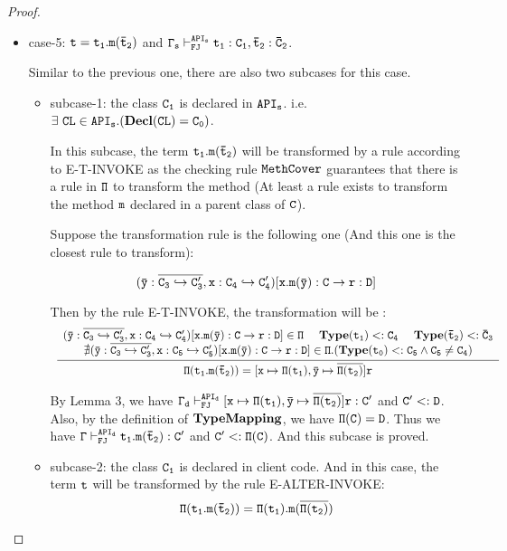 \documentclass[letterpaper]{article}
\newcommand{\env}[2]{\vdash_{#1}^{#2}}
\begin{document}
\begin{proof}
\begin{itemize}
  \item case-5: $\tt t = t_1.m(\bar{t}_2)$ and $\tt \Gamma_s\env{FJ}{API_s}t_1:C_1,\bar{t}_2:\bar{C}_2$.

  Similar to the previous one, there are also two subcases for this case.
  \begin{itemize}
    \item subcase-1: the class $\tt C_1$ is declared in $\tt API_s$. i.e. $\tt \exists~CL\in API_s.(\mathbf{Decl}(CL)=C_0)$.

    In this subcase, the term $\tt t_1.m(\bar{t}_2)$ will be transformed by a rule according to E-T-INVOKE as the checking rule $\tt MethCover$ guarantees that there is a rule in $\tt \Pi$ to transform the method (At least a rule exists to transform the method $\tt m$ declared in a parent class of $\tt C$).

    Suppose the transformation rule is the following one (And this one is the closest rule to transform):

    $$\tt (\bar{y}:\overline{C_3\hookrightarrow C'_3}, x:C_4\hookrightarrow C'_4)[x.m(\bar{y}):C\rightarrow r:D]$$

    Then by the rule E-T-INVOKE, the transformation will be :
    \[
      \begin{array}{c}
        \infer
        {\tt \Pi(t_1.m(\bar{t}_2))=[x\mapsto\Pi(t_1), \bar{y}\mapsto\overline{\Pi(t_2)}]r}
        {
          \begin{array}{c c}
            \tt (\bar{y}:\overline{C_3\hookrightarrow C'_3}, x:C_4\hookrightarrow C'_4)[x.m(\bar{y}):C\rightarrow r:D]\in\Pi ~~~~
            \tt \mathbf{Type}(t_1) <: C_4 ~~~~ \mathbf{Type}(\bar{t}_2)<:\bar{C}_3 \\
            \tt \nexists (\bar{y}:\overline{C_3\hookrightarrow C'_3}, x:C_5\hookrightarrow C'_5)[x.m(\bar{y}):C\rightarrow r:D]\in\Pi.(\mathbf{Type}(t_0)<:C_5 \land C_5\neq C_4)
          \end{array}
        }
      \end{array}
    \]

    By Lemma 3, we have $\tt \Gamma_d\env{FJ}{API_d}[x\mapsto\Pi(t_1), \bar{y}\mapsto\overline{\Pi(t_2)}]r:C'$ and $\tt C'<:D$. Also, by the definition of $\tt \mathbf{TypeMapping}$, we have $\tt \Pi(C)=D$. Thus we have $\tt\Gamma\env{FJ}{API_d}t_1.m(\bar{t}_2):C'$ and $\tt C'<:\Pi(C)$. And this subcase is proved.

    \item subcase-2: the class $\tt C_1$ is declared in client code. And in this case, the term $\tt t$ will be transformed by the rule E-ALTER-INVOKE:
    $$\tt \Pi(t_1.m(\bar{t}_2))=\Pi(t_1).m(\overline{\Pi(t_2)})$$


\end{itemize}
\end{itemize}
\end{proof}
\end{document}

